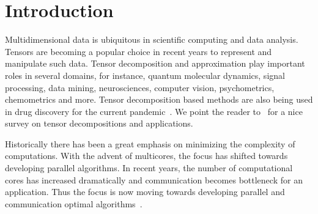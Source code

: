 \documentclass[runningheads]{llncs}
\begin{document}
\section{Introduction}
\label{sec:introduction}
Multidimensional data is ubiquitous in scientific computing and data analysis. Tensors are becoming a popular choice in recent years to represent and manipulate such data. Tensor decomposition and approximation play important roles in several domains, for instance, quantum molecular dynamics, signal processing, data mining, neurosciences, computer vision, psychometrics, chemometrics and more. Tensor decomposition based methods are also being used in drug discovery for the current pandemic~\cite{tensormethod-dd2}. We point the reader to~\cite{tensor-basics} for a nice survey on tensor decompositions and applications.

Historically there has been a great emphasis on minimizing the complexity of computations. With the advent of multicores, the focus has shifted towards developing parallel algorithms. In recent years, the number of computational cores has increased dramatically and communication becomes bottleneck for an application. Thus the focus is now moving towards developing parallel and communication optimal algorithms~\cite{qr-lu-2012,Ballard-mcnla-2011}.
\end{document}
